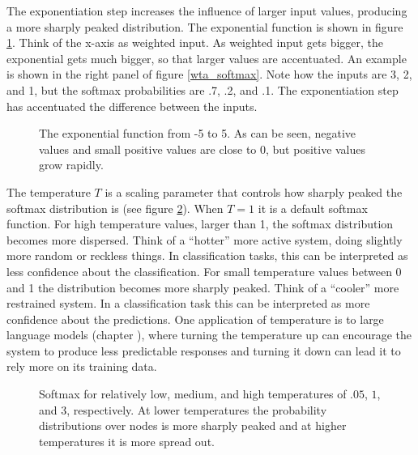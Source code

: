 The exponentiation step increases the influence of larger input values, producing a more sharply peaked distribution. The exponential function is shown in figure \ref{exponentiation}. Think of the x-axis as weighted input. As weighted input gets bigger, the exponential gets much bigger, so that larger values are accentuated. An example is shown in the right panel of figure \ref{wta_softmax}. Note how the inputs are 3, 2, and 1, but the softmax probabilities are .7, .2, and .1. The exponentiation step has accentuated the difference between the inputs.

\begin{figure}[h]
\centering
{}
\caption[Jeff Yoshimi using Wolfram Alpha.]{The exponential function from -5 to 5. As can be seen, negative values and small positive values are close to 0, but positive values grow rapidly.}
\label{exponentiation}
\end{figure}

The temperature $T$ is a scaling parameter that controls how sharply peaked the softmax distribution is (see figure \ref{softmaxTemps}). When $T=1$ it is a default softmax function.  For high temperature values, larger than 1, the softmax distribution becomes more dispersed. Think of a ``hotter'' more active system, doing slightly more random or reckless things. In classification tasks, this can be interpreted as less confidence about the classification.  For small temperature values between 0 and 1 the distribution becomes more sharply peaked. Think of a ``cooler'' more restrained system. In a classification task this can be interpreted as more confidence about the predictions.  One application of temperature is to large language models (chapter ), where turning the temperature up can encourage the system to produce less predictable responses and turning it down can lead it to rely more on its training data.

\begin{figure}[h]
\centering
{}
\caption[Jeff Yoshimi.]{Softmax for relatively low, medium, and high temperatures of $.05$, $1$, and $3$, respectively. At lower temperatures the probability distributions over nodes is more sharply peaked and at higher temperatures it is more spread out.}
\label{softmaxTemps}
\end{figure}

